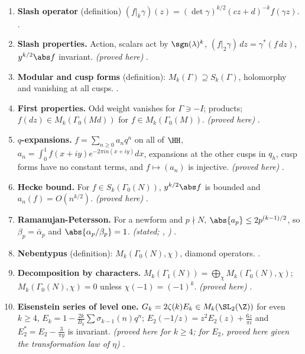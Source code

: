 \begin{enumerate}[label=\textbf{\thechapter.\arabic*}]
objects; $X_0(N)$ has a model over $\Q$. \emph{(proved here for (i) to (iii), given ; (iv), (v) stated; \cite{DeligneRapoport73}, \cite{KatzMazur85}, \cite{DiamondShurman})}
.
\item \textbf{Slash operator} (definition) $(f|_k\gamma)(z)=(\det\gamma)^{k/2}(cz+d)^{-k}f(\gamma z)$. .
\item \textbf{Slash properties.} Action, scalars act by $\sgn(\lambda)^k$, $(f|_2\gamma)\,dz=\gamma^*(f\,dz)$, $y^{k/2}\abs f$ invariant. \emph{(proved here)} .
\item \textbf{Modular and cusp forms} (definition): $M_k(\Gamma)\supseteq S_k(\Gamma)$, holomorphy and vanishing at all cusps. .
\item \textbf{First properties.} Odd weight vanishes for $\Gamma\ni-I$; products; $f(dz)\in M_k(\Gamma_0(Md))$ for $f\in M_k(\Gamma_0(M))$. \emph{(proved here)} .
\item \textbf{$q$-expansions.} $f=\sum_{n\ge0}a_nq^n$ on all of $\HH$, $a_n=\int_0^1f(x+iy)e^{-2\pi in(x+iy)}dx$, expansions at the other cusps in $q_h$, cusp forms have no constant terms, and
$f\mapsto(a_n)$ is injective. \emph{(proved here)} .
\item \textbf{Hecke bound.} For $f\in S_k(\Gamma_0(N))$, $y^{k/2}\abs f$ is bounded and $a_n(f)=O(n^{k/2})$. \emph{(proved here)} .
\item \textbf{Ramanujan-Petersson.} For a newform and $p\nmid N$, $\abs{a_p}\le2p^{(k-1)/2}$, so $\beta_p=\bar\alpha_p$ and $\abs{\alpha_p/\beta_p}=1$. \emph{(stated; \cite{Deligne}, \cite{DiamondShurman})}
.
\item \textbf{Nebentypus} (definition): $M_k(\Gamma_0(N),\chi)$, diamond operators. .
\item \textbf{Decomposition by characters.} $M_k(\Gamma_1(N))=\bigoplus_\chi M_k(\Gamma_0(N),\chi)$; $M_k(\Gamma_0(N),\chi)=0$ unless $\chi(-1)=(-1)^k$. \emph{(proved here)} .
\item \textbf{Eisenstein series of level one.} $G_k=2\zeta(k)E_k\in M_k(\SL_2(\Z))$ for even $k\ge4$, $E_k=1-\frac{2k}{B_k}\sum\sigma_{k-1}(n)q^n$; $E_2(-1/z)=z^2E_2(z)+\frac{6z}{\pi i}$ and $E_2^*=E_2-\frac3{\pi y}$
is invariant. \emph{(proved here for $k\ge4$; for $E_2$, proved here given the transformation law of $\eta$)} .

\end{enumerate}
